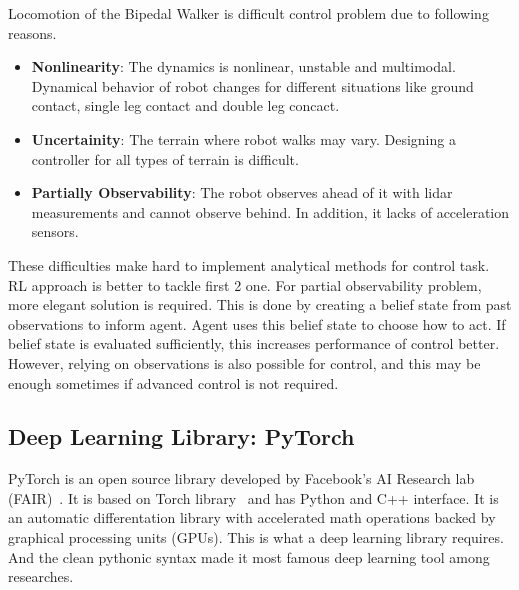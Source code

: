 Locomotion of the Bipedal Walker is difficult control problem due to following reasons. 
\begin{itemize}
	\item \textbf{Nonlinearity}: The dynamics is nonlinear, unstable and multimodal. 
	Dynamical behavior of robot changes for different situations 
	like ground contact, single leg contact and double leg concact. 
	\item \textbf{Uncertainity}: The terrain where robot walks may vary. 
	Designing a controller for all types of terrain is difficult.
	\item \textbf{Partially Observability}: The robot observes 
	ahead of it with lidar measurements and cannot observe behind. 
	In addition, it lacks of acceleration sensors.
\end{itemize}
These difficulties make hard to implement analytical methods for control task. 
RL approach is better to tackle first 2 one. 
For partial observability problem, more elegant solution is required. 
This is done by creating a belief state from past observations to inform agent. 
Agent uses this belief state to choose how to act. 
If belief state is evaluated sufficiently, 
this increases performance of control better.
However, relying on observations is also possible for control, 
and this may be enough sometimes if advanced control is not required. 


\subsection{Deep Learning Library: PyTorch}
\label{dl_pytorch}
PyTorch is an open source library developed by Facebook's AI Research lab (FAIR)~\cite{paszke_pytorch_2019}. 
It is based on Torch library~\cite{collobert_torch7_2011} and has Python and C++ interface. 
It is an automatic differentation library with accelerated math operations backed by graphical processing units (GPUs). 
This is what a deep learning library requires. 
And the clean pythonic syntax made it most famous deep learning tool among researches. 
